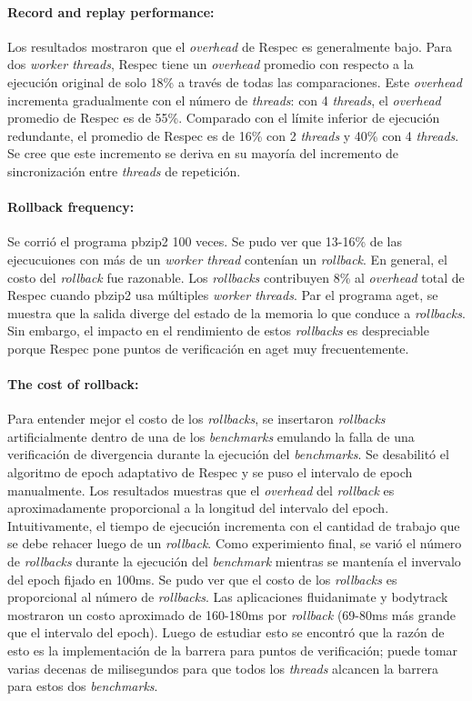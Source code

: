 \paragraph{Record and replay performance:} 
Los resultados mostraron que el \emph{overhead} de Respec es generalmente bajo. Para dos \emph{worker threads}, Respec tiene un \emph{overhead} promedio con respecto a la ejecución original de solo 18\% a través de todas las comparaciones. Este \emph{overhead} incrementa gradualmente con el número de \emph{threads}: con 4 \emph{threads}, el \emph{overhead} promedio de Respec es de 55\%. Comparado con el límite inferior de ejecución redundante, el promedio de Respec es de 16\% con 2 \emph{threads} y 40\% con 4 \emph{threads}. Se cree que este incremento se deriva en su mayoría del incremento de sincronización entre \emph{threads} de repetición.

\paragraph{Rollback frequency:} 
Se corrió el programa pbzip2 100 veces. Se pudo ver que 13-16\% de las ejecucuiones con más de un \emph{worker thread} contenían un \emph{rollback}. En general, el costo del \emph{rollback} fue razonable. Los \emph{rollbacks} contribuyen 8\% al \emph{overhead} total de Respec cuando pbzip2 usa múltiples \emph{worker threads}. Par el programa aget, se muestra que la salida diverge del estado de la memoria lo que conduce a \emph{rollbacks}. Sin embargo, el impacto en el rendimiento de estos \emph{rollbacks} es despreciable porque Respec pone puntos de verificación en aget muy frecuentemente.

\paragraph{The cost of rollback:}
Para entender mejor el costo de los \emph{rollbacks}, se insertaron \emph{rollbacks} artificialmente dentro de una de los \emph{benchmarks} emulando la falla de una verificación de divergencia durante la ejecución del \emph{benchmarks}. Se desabilitó el algoritmo de epoch adaptativo de Respec y se puso el intervalo de epoch manualmente. Los resultados muestras que el \emph{overhead} del \emph{rollback} es aproximadamente proporcional a la longitud del intervalo del epoch. Intuitivamente, el tiempo de ejecución incrementa con el cantidad de trabajo que se debe rehacer luego de un \emph{rollback}. Como experimiento final, se varió el número de \emph{rollbacks} durante la ejecución del \emph{benchmark} mientras se mantenía el invervalo del epoch fijado en 100ms. Se pudo ver que el costo de los \emph{rollbacks} es proporcional al número de \emph{rollbacks}. Las aplicaciones fluidanimate y bodytrack mostraron un costo aproximado de 160-180ms por \emph{rollback} (69-80ms más grande que el intervalo del epoch). Luego de estudiar esto se encontró que la razón de esto es la implementación de la barrera para puntos de verificación; puede tomar varias decenas de milisegundos para que todos los \emph{threads} alcancen la barrera para estos dos \emph{benchmarks}.